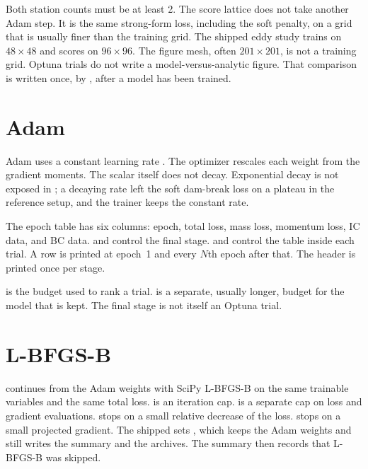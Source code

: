 Both station counts must be at least 2.
The score lattice does not take another Adam step.
It is the same strong-form loss, including the soft penalty, on a grid that is usually finer than the training grid.
The shipped eddy study trains on \(48\times 48\) and scores on \(96\times 96\).
The figure mesh, often \(201\times 201\), is not a training grid.
Optuna trials do not write a model-versus-analytic figure.
That comparison is written once, by , after a model has been trained.

\section{Adam}

Adam uses a constant learning rate .
The optimizer rescales each weight from the gradient moments.
The scalar itself does not decay.
Exponential decay is not exposed in ; a decaying rate left the soft dam-break loss on a plateau in the reference setup, and the trainer keeps the constant rate.

The epoch table has six columns: epoch, total loss, mass loss, momentum loss, IC data, and BC data.
 and  control the final stage.
 and  control the table inside each trial.
A row is printed at epoch~1 and every \(N\)th epoch after that.
The header is printed once per stage.

 is the budget used to rank a trial.
 is a separate, usually longer, budget for the model that is kept.
The final stage is not itself an Optuna trial.

\section{L-BFGS-B}

 continues from the Adam weights with SciPy L-BFGS-B on the same trainable variables and the same total loss.
 is an iteration cap.
 is a separate cap on loss and gradient evaluations.
 stops on a small relative decrease of the loss.
 stops on a small projected gradient.
The shipped  sets , which keeps the Adam weights and still writes the summary and the archives.
The summary then records that L-BFGS-B was skipped.

